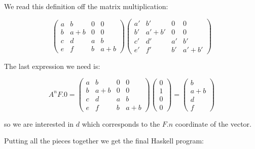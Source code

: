 We read this definition off the matrix multiplication:

\begin{equation*}
\begin{pmatrix}
       a & b & 0 & 0\\
       b & a + b & 0 & 0\\
       c & d & a & b\\
       e & f & b & a + b
       \end{pmatrix}
  \begin{pmatrix}
       a' & b' & 0 & 0\\
       b' & a' + b' & 0 & 0\\
       c' & d' & a' & b'\\
       e' & f' & b' & a' + b'
       \end{pmatrix}     
\end{equation*}

The last expression we need is:

\begin{equation*}
A^n F.0 = \begin{pmatrix}
       a & b & 0 & 0\\
       b & a + b & 0 & 0\\
       c & d & a & b\\
       e & f & b & a + b
       \end{pmatrix} 
 \begin{pmatrix}
       0\\
       1\\
       0\\
       0
       \end{pmatrix}   = 
    \begin{pmatrix}
       b\\
       a + b\\
       d\\
        f
       \end{pmatrix}    
\end{equation*} 

so we are interested in $d$ which corresponds to the $F.n$ coordinate of the vector.      

Putting all the pieces together we get the final Haskell program:








